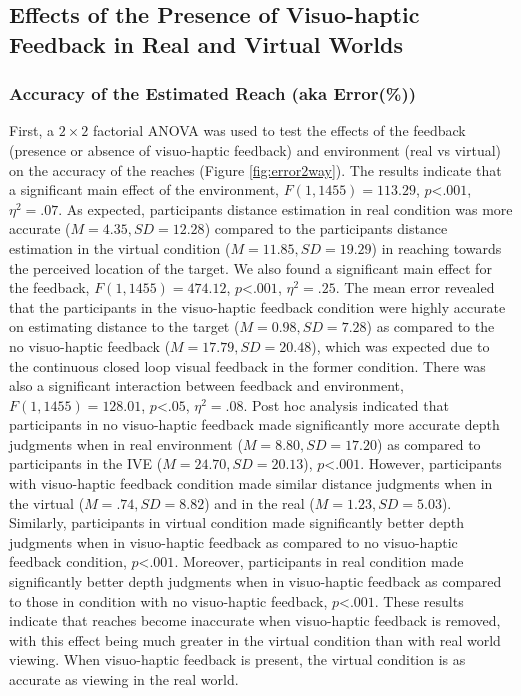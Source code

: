 \subsection{Effects of the Presence of Visuo-haptic Feedback in Real and Virtual Worlds} \label{part1}
\subsubsection {Accuracy of the Estimated Reach (aka Error(\%))} \label{accuracy2way}
First, a $2\times2$ factorial ANOVA was used to test the effects of the feedback (presence or absence of visuo-haptic feedback) and environment (real vs virtual) on the accuracy of the reaches (Figure \ref{fig:error2way}). The results indicate that a significant main effect of the environment, $F(1,1455)=113.29$, $p$\textless$.001$, $\eta^{2}=.07$. As expected, participants distance estimation in real condition was more accurate ($M=4.35, SD=12.28$) compared to the participants distance estimation in the virtual condition ($M=11.85, SD=19.29$) in reaching towards the perceived location of the target. We also found a significant main effect for the feedback, $F(1,1455)=474.12$, $p$\textless$.001$, $\eta^{2}=.25$. The mean error revealed that the participants in the visuo-haptic feedback condition were highly accurate on estimating distance to the target ($M=0.98, SD=7.28$) as compared to the no visuo-haptic feedback ($M=17.79, SD=20.48$), which was expected due to the continuous closed loop visual feedback in the former condition. There was also a significant interaction between feedback and environment, $F(1,1455)=128.01$, $p$\textless$.05$, $\eta^{2}=.08$. Post hoc analysis indicated that participants in no visuo-haptic feedback made significantly more accurate depth judgments when in real environment ($M=8.80, SD=17.20$) as compared to participants in the IVE ($M=24.70, SD=20.13$), $p$\textless$.001$. However, participants with visuo-haptic feedback condition made similar distance judgments when in the virtual ($M=.74, SD=8.82$) and in the real ($M=1.23, SD=5.03$). Similarly, participants in virtual condition made significantly better depth judgments when in visuo-haptic feedback as compared to no visuo-haptic feedback condition, $p$\textless$.001$. Moreover, participants in real condition made significantly better depth judgments when in visuo-haptic feedback as compared to those in condition with no visuo-haptic feedback, $p$\textless$.001$. These results indicate that reaches become inaccurate when visuo-haptic feedback is removed, with this effect being much greater in the virtual condition than with real world viewing. When visuo-haptic feedback is present, the virtual condition is as accurate as viewing in the real world.

